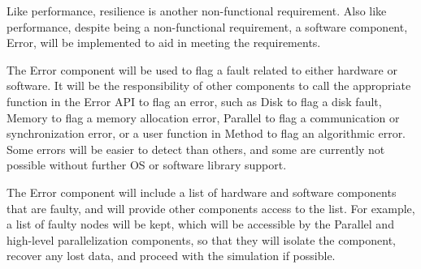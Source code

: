 \documentclass[11pt,letterpaper]{article}
\newcommand{\code}[1]{\textsf{#1}}
\begin{document}
Like performance, resilience is another non-functional requirement.
Also like performance, despite being a non-functional requirement, a
software component, \code{Error}, will be implemented to aid in
meeting the requirements.

The \code{Error} component will be used to flag a fault related to
either hardware or software.  It will be the responsibility of other
components to call the appropriate function in the \code{Error} API to
flag an error, such as \code{Disk} to flag a disk fault, \code{Memory}
to flag a memory allocation error, \code{Parallel} to flag a
communication or synchronization error, or a user function in
\code{Method} to flag an algorithmic error.  Some errors will be
easier to detect than others, and some are currently not possible
without further OS or software library support.

The \code{Error} component will include a list of hardware and software
components that are faulty, and will provide other components access to
the list.  For example, a list of faulty nodes will be kept, which will
be accessible by the \code{Parallel} and high-level parallelization components,
so that they will isolate the component, recover any lost data, and proceed
with the simulation if possible.

% 
% 
\end{document}
